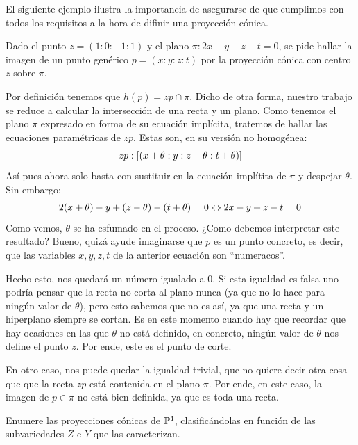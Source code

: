 El siguiente ejemplo ilustra la importancia de asegurarse de que cumplimos con todos los requisitos a la hora de difinir una proyección cónica.
\begin{exa}
	Dado el punto $z=(1:0:-1:1)$ y el plano $\pi:2x-y+z-t=0$, se pide hallar la imagen de un punto genérico $p=(x:y:z:t)$ por la proyección cónica con centro $z$ sobre $\pi$.
	
	Por definición tenemos que $h(p)=zp\cap\pi$. Dicho de otra forma, nuestro trabajo se reduce a calcular la intersección de una recta y un plano. Como tenemos el plano $\pi$ expresado en forma de su ecuación implícita, tratemos de hallar las ecuaciones paramétricas de $zp$. Estas son, en su versión no homogénea:
	\[zp:\left [ (x+\theta:y:z-\theta:t+\theta) \right ]\]
	Así pues ahora solo basta con sustituir en la ecuación implítita de $\pi$ y despejar $\theta$. Sin embargo:
	\[2(x+\theta)-y+(z-\theta)-(t+\theta)=0\Leftrightarrow2x-y+z-t=0\]
	Como vemos, $\theta$ se ha esfumado en el proceso. ¿Como debemos interpretar este resultado? Bueno, quizá ayude imaginarse que $p$ es un punto concreto, es decir, que las variables $x,y,z,t$ de la anterior ecuación son ``numeracos''.
	
	Hecho esto, nos quedará un número igualado a $0$. Si esta igualdad es falsa uno podría pensar que la recta no corta al plano nunca (ya que no lo hace para ningún valor de $\theta$), pero esto sabemos que no es así, ya que una recta y un hiperplano siempre se cortan. Es en este momento cuando hay que recordar que hay ocasiones en las que $\theta$ no está definido, en concreto, ningún valor de $\theta$ nos define el punto $z$. Por ende, este es el punto de corte.
	
	En otro caso, nos puede quedar la igualdad trivial, que no quiere decir otra cosa que que la recta $zp$ está contenida en el plano $\pi$. Por ende, en este caso, la imagen de $p\in\pi$ no está bien definida, ya que es toda una recta.
\end{exa}
\begin{exerc}
	Enumere las proyecciones cónicas de $\mathbb{P}^4$, clasificándolas en función de las subvariedades $Z$ e $Y$ que las caracterizan.
\end{exerc}

